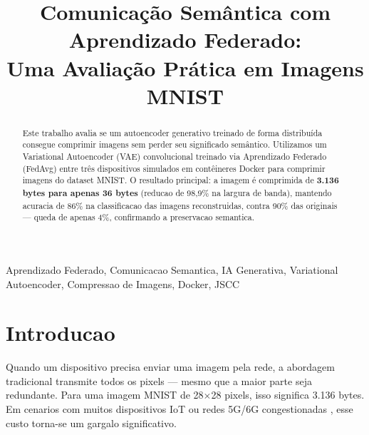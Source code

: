 \documentclass[conference]{IEEEtran}
\begin{document}
\title{Comunicação Semântica com Aprendizado Federado:\\
Uma Avaliação Prática em Imagens MNIST}

\author{
}

\maketitle

\begin{abstract}
Este trabalho avalia se um autoencoder generativo treinado de forma distribuída
consegue comprimir imagens sem perder seu significado semântico.
Utilizamos um Variational Autoencoder (VAE) convolucional treinado via
Aprendizado Federado (FedAvg) entre três dispositivos simulados em contêineres
Docker para comprimir imagens do dataset MNIST.
O resultado principal: a imagem é comprimida de \textbf{3.136 bytes para apenas
36 bytes} (reducao de 98,9\% na largura de banda), mantendo acuracia de 86\%
na classificacao das imagens reconstruidas, contra 90\% das originais ---
queda de apenas 4\%, confirmando a preservacao semantica.
\end{abstract}

\begin{IEEEkeywords}
Aprendizado Federado, Comunicacao Semantica, IA Generativa, Variational Autoencoder,
Compressao de Imagens, Docker, JSCC
\end{IEEEkeywords}


\section{Introducao}

Quando um dispositivo precisa enviar uma imagem pela rede, a abordagem
tradicional transmite todos os pixels --- mesmo que a maior parte seja redundante.
Para uma imagem MNIST de 28$\times$28 pixels, isso significa 3.136 bytes.
Em cenarios com muitos dispositivos IoT ou redes 5G/6G congestionadas
\cite{kairouz2021advances}, esse custo torna-se um gargalo significativo.
\end{document}
